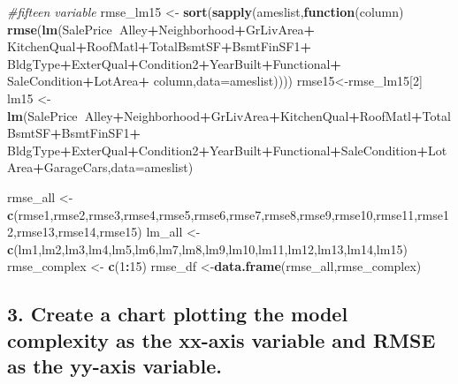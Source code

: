 \documentclass[]{article}
\newenvironment{Shaded}{\begin{snugshade}}{\end{snugshade}}
\newcommand{\CommentTok}[1]{\textcolor[rgb]{0.56,0.35,0.01}{\textit{#1}}}
\newcommand{\ControlFlowTok}[1]{\textcolor[rgb]{0.13,0.29,0.53}{\textbf{#1}}}
\newcommand{\DataTypeTok}[1]{\textcolor[rgb]{0.13,0.29,0.53}{#1}}
\newcommand{\DecValTok}[1]{\textcolor[rgb]{0.00,0.00,0.81}{#1}}
\newcommand{\KeywordTok}[1]{\textcolor[rgb]{0.13,0.29,0.53}{\textbf{#1}}}
\newcommand{\NormalTok}[1]{#1}
\newcommand{\OperatorTok}[1]{\textcolor[rgb]{0.81,0.36,0.00}{\textbf{#1}}}
\newcommand{\StringTok}[1]{\textcolor[rgb]{0.31,0.60,0.02}{#1}}
\begin{document}
\begin{Shaded}
\begin{Highlighting}[]
\CommentTok{#fifteen variable}
\NormalTok{rmse_lm15 <-}\StringTok{ }\KeywordTok{sort}\NormalTok{(}\KeywordTok{sapply}\NormalTok{(ameslist,}\ControlFlowTok{function}\NormalTok{(column) }\KeywordTok{rmse}\NormalTok{(}\KeywordTok{lm}\NormalTok{(SalePrice}\OperatorTok{~}\NormalTok{Alley}\OperatorTok{+}\NormalTok{Neighborhood}\OperatorTok{+}\NormalTok{GrLivArea}\OperatorTok{+}
\StringTok{                                                             }\NormalTok{KitchenQual}\OperatorTok{+}\NormalTok{RoofMatl}\OperatorTok{+}\NormalTok{TotalBsmtSF}\OperatorTok{+}\NormalTok{BsmtFinSF1}\OperatorTok{+}
\StringTok{                                                             }\NormalTok{BldgType}\OperatorTok{+}\NormalTok{ExterQual}\OperatorTok{+}\NormalTok{Condition2}\OperatorTok{+}\NormalTok{YearBuilt}\OperatorTok{+}\NormalTok{Functional}\OperatorTok{+}
\StringTok{                                                             }\NormalTok{SaleCondition}\OperatorTok{+}\NormalTok{LotArea}\OperatorTok{+}
\StringTok{                                                             }\NormalTok{column,}\DataTypeTok{data=}\NormalTok{ameslist))))}
\NormalTok{rmse15<-rmse_lm15[}\DecValTok{2}\NormalTok{]}
\NormalTok{lm15 <-}\StringTok{ }\KeywordTok{lm}\NormalTok{(SalePrice}\OperatorTok{~}\NormalTok{Alley}\OperatorTok{+}\NormalTok{Neighborhood}\OperatorTok{+}\NormalTok{GrLivArea}\OperatorTok{+}\NormalTok{KitchenQual}\OperatorTok{+}\NormalTok{RoofMatl}\OperatorTok{+}\NormalTok{TotalBsmtSF}\OperatorTok{+}\NormalTok{BsmtFinSF1}\OperatorTok{+}
\StringTok{             }\NormalTok{BldgType}\OperatorTok{+}\NormalTok{ExterQual}\OperatorTok{+}\NormalTok{Condition2}\OperatorTok{+}\NormalTok{YearBuilt}\OperatorTok{+}\NormalTok{Functional}\OperatorTok{+}\NormalTok{SaleCondition}\OperatorTok{+}\NormalTok{LotArea}\OperatorTok{+}\NormalTok{GarageCars,}\DataTypeTok{data=}\NormalTok{ameslist)}

\NormalTok{rmse_all <-}\StringTok{ }\KeywordTok{c}\NormalTok{(rmse1,rmse2,rmse3,rmse4,rmse5,rmse6,rmse7,rmse8,rmse9,rmse10,rmse11,rmse12,rmse13,rmse14,rmse15)}
\NormalTok{lm_all <-}\StringTok{ }\KeywordTok{c}\NormalTok{(lm1,lm2,lm3,lm4,lm5,lm6,lm7,lm8,lm9,lm10,lm11,lm12,lm13,lm14,lm15)}
\NormalTok{rmse_complex <-}\StringTok{ }\KeywordTok{c}\NormalTok{(}\DecValTok{1}\OperatorTok{:}\DecValTok{15}\NormalTok{)}
\NormalTok{rmse_df <-}\KeywordTok{data.frame}\NormalTok{(rmse_all,rmse_complex)}
\end{Highlighting}
\end{Shaded}

\hypertarget{create-a-chart-plotting-the-model-complexity-as-the-xx-axis-variable-and-rmse-as-the-yy-axis-variable.}{%
\subsection{3. Create a chart plotting the model complexity as the
xx-axis variable and RMSE as the yy-axis
variable.}\label{create-a-chart-plotting-the-model-complexity-as-the-xx-axis-variable-and-rmse-as-the-yy-axis-variable.}}
\end{document}
